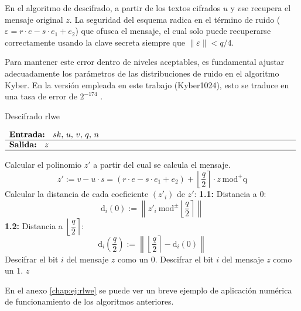 En el algoritmo de descifrado, a partir de los textos cifrados \(u\) y \(v\)se recupera el mensaje original \(z\). La seguridad del esquema radica en el término de ruido ($\varepsilon=r\cdot e- s\cdot e_1 +e_2$) que ofusca el mensaje, el cual solo puede recuperarse correctamente usando la clave secreta siempre que \(\left\|\varepsilon\right\|< q/4\).
\newline

Para mantener este error dentro de niveles aceptables, es fundamental ajustar adecuadamente los parámetros de las distribuciones de ruido en el algoritmo Kyber. En la versión empleada en este trabajo (Kyber1024), esto se traduce en una tasa de error de $2^{-174}$ \cite{pqcrystalssecurity}.
\newpage
\begin{algorithm}[H]
	\caption{Descifrado \acrshort{rlwe} \protect\footnotemark[\value{footnote}]} 
	$\begin{array}{p{\textwidth}}
		\textbf{Entrada: } \(sk\), \(u\), \(v\), \(q\), \(n\)\\ 
		\hline
		\textbf{Salida: } \(z\)\\ 
		\hline
	\end{array}$
	\begin{algorithmic}[1]
		\State Calcular el polinomio \(z'\) a partir del cual se calcula el mensaje.
		\begin{equation}
			\label{eq:ruidoLWE}
			z':=v-u\cdot s = \left(r\cdot e- s\cdot e_1 +e_2\right)+\left\lfloor \dfrac{q}{2} \right\rceil \cdot z \ \text{mod}^{+}\text{q}
		\end{equation}
		\State Calcular la distancia de cada coeficiente \((z'_i)\) de \(z'\):
		\Statex \hspace{1em} \textbf{1.1:} Distancia a \(0\):
		\begin{equation}
			\text{d}_i(0):=\left\| z'_i \ \text{mod}^{\pm} \left\lfloor \dfrac{q}{2} \right\rceil \right\| 
		\end{equation} 
		\Statex \hspace{1em} \textbf{1.2:} Distancia a $\left\lfloor \dfrac{q}{2} \right\rceil$:
			\begin{equation}
			\text{d}_i\left(\dfrac{q}{2}\right):=\left\| \left\lfloor \dfrac{q}{2} \right\rceil - \text{d}_i(0)\right\| 
		\end{equation} 
			\Statex
			\State Descifrar el bit \(i\) del mensaje \(z\) como un \(0\).
		\Else
			\State Descifrar el bit \(i\) del mensaje \(z\) como un \(1\).
		\EndIf
		\State \Return \(z\)
	\end{algorithmic}
\end{algorithm}
 En el anexo \ref{chap:ej:rlwe} se puede ver un breve ejemplo de aplicación numérica de funcionamiento de los algoritmos anteriores.


